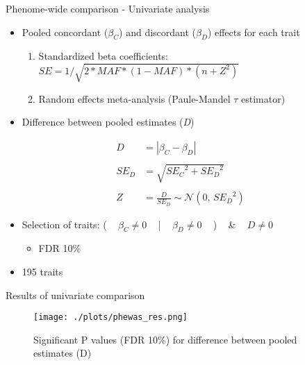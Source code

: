 \documentclass[presentation]{beamer}
\begin{document}
\begin{frame}[label={sec:org7ad5bc3}]{Phenome-wide comparison - Univariate analysis}
\begin{itemize}
\item Pooled concordant (\(\beta_C\)) and discordant (\(\beta_D\)) effects for each trait
\begin{enumerate}
\item Standardized beta coefficients: ~ \(SE = 1/\sqrt{2 * MAF * (1 - MAF) * (n + Z^2)}\)
\item Random effects meta-analysis (Paule-Mandel \(\tau\) estimator)
\end{enumerate}
\item Difference between pooled estimates (\emph{D})
\end{itemize}
\begin{align*}
D & = |\beta_C - \beta_D|\\
\\
SE_D & = \sqrt{{SE_C}^2 + {SE_D}^2}\\
\\
Z & = \frac{D}{SE_D} \sim \mathcal{N}(0,\,{SE_D}^{2})
\end{align*}
\begin{itemize}
\item Selection of traits: ( ~ \(\beta_C \ne 0\) ~ | ~ \(\beta_D \ne 0\) ~ ) ~ \& ~ \(D \ne 0\)
\begin{itemize}
\item FDR 10\%
\end{itemize}
\item 195 traits
\end{itemize}
\end{frame}
\begin{frame}[label={sec:org73cf853}]{Results of univariate comparison}
\begin{figure}[htbp]
\centering
\texttt{[image: ./plots/phewas\_res.png]}
\caption{Significant P values (FDR 10\%) for difference between pooled estimates (D)}
\end{figure}
\end{frame}
\end{document}
